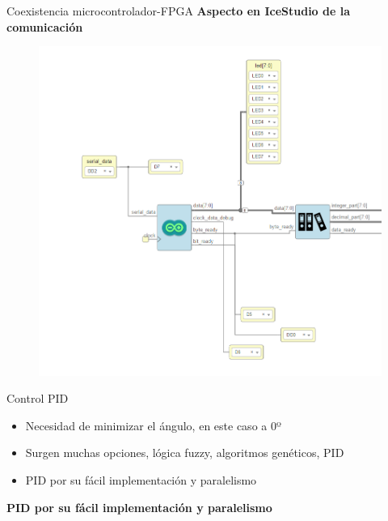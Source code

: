 \documentclass{beamer}
\begin{document}
\begin{frame}{Coexistencia microcontrolador-FPGA}
\centering \textbf{Aspecto en IceStudio de la comunicación}
\begin{figure}[H]
	\center
	\includegraphics[scale=0.3]{imagenes/Balancing_robot/arduino_arrange.PNG}
\end{figure}
\end{frame}





\begin{frame}{Control PID}
\begin{block}{}
	\begin{itemize}
		\item Necesidad de minimizar el ángulo, en este caso a 0º
		\item Surgen muchas opciones, lógica fuzzy, algoritmos genéticos, PID
		\item PID por su fácil implementación y paralelismo
	\end{itemize}
\end{block}
\begin{alertblock}
	\centering \textbf{PID por su fácil implementación y paralelismo}
\end{alertblock}
\end{frame}
\end{document}
